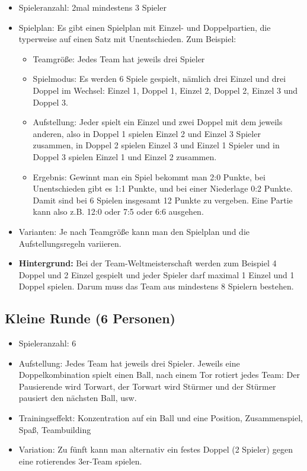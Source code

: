 \begin{itemize}
\item Spieleranzahl: 2mal mindestens 3 Spieler
\item Spielplan: Es gibt einen Spielplan mit Einzel- und Doppelpartien, die typerweise auf einen Satz mit Unentschieden. Zum Beispiel:
\begin{itemize}
\item Teamgröße: Jedes Team hat jeweils drei Spieler
\item Spielmodus: Es werden 6 Spiele gespielt, nämlich drei Einzel und drei Doppel im Wechsel: Einzel 1, Doppel 1, Einzel 2, Doppel 2, Einzel 3 und Doppel 3.
\item Aufstellung: Jeder spielt ein Einzel und zwei Doppel mit dem jeweils anderen, also in Doppel 1 spielen Einzel 2 und Einzel 3 Spieler zusammen, in Doppel 2 spielen Einzel 3 und Einzel 1 Spieler und in Doppel 3 spielen Einzel 1 und Einzel 2 zusammen.  
\item Ergebnis: Gewinnt man ein Spiel bekommt man 2:0 Punkte, bei Unentschieden gibt es 1:1 Punkte, und bei einer Niederlage 0:2 Punkte. Damit sind bei 6 Spielen insgesamt 12 Punkte zu vergeben. Eine Partie kann also z.B. 12:0 oder 7:5 oder 6:6 ausgehen. 
\end{itemize}
\item Varianten: Je nach Teamgröße kann man den Spielplan und die Aufstellungsregeln variieren. 
\item {\bf Hintergrund:} Bei der Team-Weltmeisterschaft werden zum Beispiel 4 Doppel und 2 Einzel gespielt und jeder Spieler darf maximal 1 Einzel und 1 Doppel spielen. Darum muss das Team aus mindestens 8 Spielern bestehen. 
\end{itemize}

\subsection{Kleine Runde (6 Personen)}
\label{spielformen:npersonen:kleine}

\begin{itemize}
\item Spieleranzahl: 6
\item Aufstellung: Jedes Team hat jeweils drei Spieler. Jeweils eine Doppelkombination spielt einen Ball, nach einem Tor rotiert jedes Team: Der Pausierende wird Torwart, der Torwart wird Stürmer und der Stürmer pausiert den nächsten Ball, usw.
\item Trainingseffekt: Konzentration auf ein Ball und eine Position, Zusammenspiel, Spaß, Teambuilding
\item Variation: Zu fünft kann man alternativ ein festes Doppel (2 Spieler) gegen eine rotierendes 3er-Team spielen.
\end{itemize}

